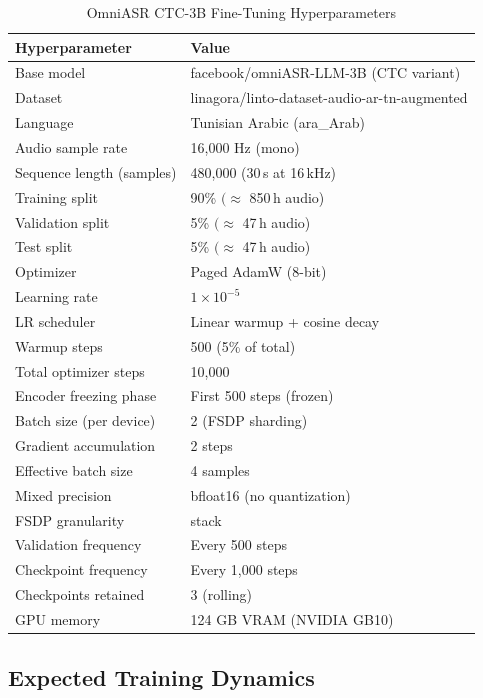\documentclass[12pt,a4paper]{report}
\begin{document}
\begin{table}[h]
\centering
\caption{OmniASR CTC-3B Fine-Tuning Hyperparameters}
\label{tab:omniasr_hparams}
\begin{tabular}{ll}
\toprule
\textbf{Hyperparameter} & \textbf{Value} \\
\midrule
Base model              & facebook/omniASR-LLM-3B (CTC variant) \\
Dataset                 & linagora/linto-dataset-audio-ar-tn-augmented \\
Language                & Tunisian Arabic (ara\_Arab) \\
Audio sample rate       & 16,000 Hz (mono) \\
Sequence length (samples) & 480,000 (30\,s at 16\,kHz) \\
Training split          & 90\% $(\approx$ 850\,h audio) \\
Validation split        & 5\% $(\approx$ 47\,h audio) \\
Test split              & 5\% $(\approx$ 47\,h audio) \\
Optimizer               & Paged AdamW (8-bit) \\
Learning rate           & $1 \times 10^{-5}$ \\
LR scheduler            & Linear warmup + cosine decay \\
Warmup steps            & 500 (5\% of total) \\
Total optimizer steps   & 10,000 \\
Encoder freezing phase  & First 500 steps (frozen) \\
Batch size (per device) & 2 (FSDP sharding) \\
Gradient accumulation   & 2 steps \\
Effective batch size    & 4 samples \\
Mixed precision         & bfloat16 (no quantization) \\
FSDP granularity        & stack \\
Validation frequency    & Every 500 steps \\
Checkpoint frequency    & Every 1,000 steps \\
Checkpoints retained    & 3 (rolling) \\
GPU memory              & 124 GB VRAM (NVIDIA GB10) \\
\bottomrule
\end{tabular}
\end{table}

\subsection{Expected Training Dynamics}
\end{document}
